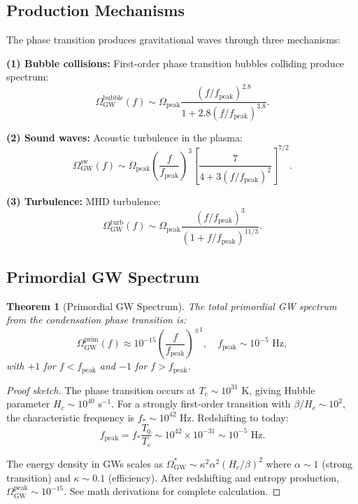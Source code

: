 \documentclass[11pt,a4paper]{article}
\newtheorem{theorem}{Theorem}[section]
\theoremstyle{definition}
\theoremstyle{remark}
\begin{document}
\subsection{Production Mechanisms}
\label{sec:production}

The phase transition produces gravitational waves through three mechanisms:

\textbf{(1) Bubble collisions:} First-order phase transition bubbles colliding produce spectrum:
\begin{equation}
\Omega_{\mathrm{GW}}^{\mathrm{bubble}}(f) \sim \Omega_{\mathrm{peak}}\frac{(f/f_{\mathrm{peak}})^{2.8}}{1 + 2.8(f/f_{\mathrm{peak}})^{3.8}}.
\end{equation}

\textbf{(2) Sound waves:} Acoustic turbulence in the plasma:
\begin{equation}
\Omega_{\mathrm{GW}}^{\mathrm{sw}}(f) \sim \Omega_{\mathrm{peak}}\left(\frac{f}{f_{\mathrm{peak}}}\right)^3\left[\frac{7}{4 + 3(f/f_{\mathrm{peak}})^2}\right]^{7/2}.
\end{equation}

\textbf{(3) Turbulence:} MHD turbulence:
\begin{equation}
\Omega_{\mathrm{GW}}^{\mathrm{turb}}(f) \sim \Omega_{\mathrm{peak}}\frac{(f/f_{\mathrm{peak}})^3}{(1 + f/f_{\mathrm{peak}})^{11/3}}.
\end{equation}

\subsection{Primordial GW Spectrum}
\label{sec:primordial_spectrum}

\begin{theorem}[Primordial GW Spectrum]
\label{thm:primordial}
The total primordial GW spectrum from the condensation phase transition is:
\begin{equation}
\label{eq:primordial_spectrum}
\boxed{\Omega_{\mathrm{GW}}^{\mathrm{prim}}(f) \approx 10^{-15}\left(\frac{f}{f_{\mathrm{peak}}}\right)^{\pm 1}, \quad f_{\mathrm{peak}} \sim 10^{-5} \text{ Hz},}
\end{equation}
with $+1$ for $f < f_{\mathrm{peak}}$ and $-1$ for $f > f_{\mathrm{peak}}$.
\end{theorem}

\begin{proof}[Proof sketch]
The phase transition occurs at $T_c \sim 10^{31}$ K, giving Hubble parameter $H_c \sim 10^{40}$ s$^{-1}$. For a strongly first-order transition with $\beta/H_c \sim 10^2$, the characteristic frequency is $f_* \sim 10^{42}$ Hz. Redshifting to today:
\begin{equation}
f_{\mathrm{peak}} = f_*\frac{T_0}{T_c} \sim 10^{42} \times 10^{-31} \sim 10^{-5} \text{ Hz}.
\end{equation}

The energy density in GWs scales as $\Omega_{\mathrm{GW}}^* \sim \kappa^2\alpha^2(H_c/\beta)^2$ where $\alpha \sim 1$ (strong transition) and $\kappa \sim 0.1$ (efficiency). After redshifting and entropy production, $\Omega_{\mathrm{GW}}^{\mathrm{peak}} \sim 10^{-15}$. See math derivations for complete calculation.
\end{proof}
\end{document}
